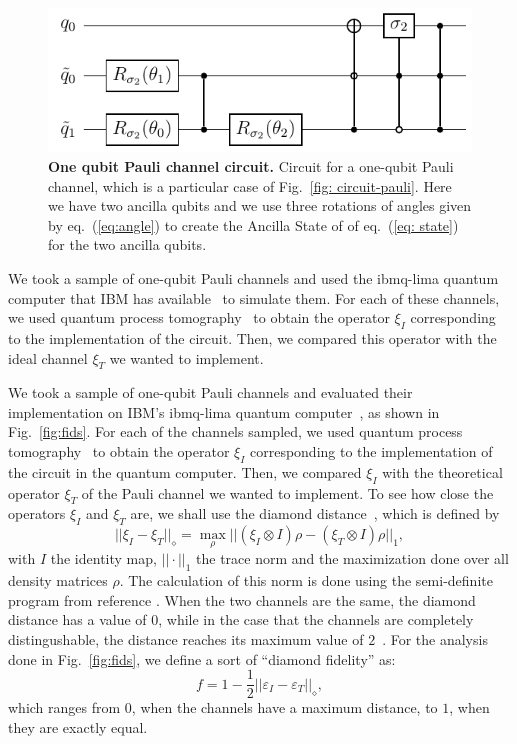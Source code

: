 \documentclass[10pt,letterpaper]{article} %
\newcommand{\fref}[1]{Fig.~\ref{#1}}
\newcommand{\eref}[1]{eq.~(\ref{#1})}
\begin{document}
\begin{figure} %
\centering
\includegraphics{images/circuito_unqubit.pdf}
\caption{
{\bf One qubit Pauli channel circuit.} Circuit for a one-qubit Pauli channel,
which is a particular case of \fref{fig: circuit-pauli}.  Here we have two
ancilla qubits and we use three rotations
of angles given by \eref{eq:angle} to create the Ancilla State of
of \eref{eq: state} for the two ancilla qubits.
}
\label{fig: circuit-pauli-1} 
\end{figure} %


We took a sample of one-qubit Pauli channels and
used the ibmq-lima quantum computer that IBM has available~\cite{Qiskit}
to simulate them. For each of these channels, we used quantum process
tomography~\cite{Qiskit, Chuang:1996} to obtain the 
operator $\xi_I$ corresponding to the implementation of the
circuit.  Then, we compared this operator with the ideal 
channel $\xi_T$  we
wanted to implement.  


We took a sample of one-qubit Pauli channels
and evaluated their implementation on IBM's
ibmq-lima quantum computer~\cite{Qiskit},
as shown in \fref{fig:fids}. 
For each of the channels sampled, we used 
quantum process tomography~\cite{Qiskit, Chuang:1996} to obtain the 
operator $\xi_I$ corresponding to the implementation of the
circuit in the quantum computer. 
Then, we compared $\xi_I$ with the theoretical 
operator $\xi_T$ of the Pauli channel we wanted to implement.
To see how close the operators $\xi_I$ and 
$\xi_T$ are, we shall use the
diamond distance~\cite{Aharonov,Wilde}, which is defined by
\begin{equation}
||\xi_I - \xi_T ||_{\diamond}  = \max_{\rho} || (\xi_I \otimes I) \rho - (\xi_T \otimes I) \rho ||_1,
\end{equation}
with $I$ the identity map,
$|| \cdot ||_1$ the trace norm and the maximization
done over all density matrices $\rho$.
The calculation of this norm is done using the semi-definite program from reference \cite{Watrous}.
When the two channels are the same,
the diamond distance has a value of $0$, while in the case that the channels
are completely distingushable, the distance reaches its maximum value of $2$~\cite{Benenti}.
For the analysis done in \fref{fig:fids}, we define a sort of ``diamond fidelity'' as: 
\begin{equation}
f = 1 - \dfrac{1}{2} ||\varepsilon_I - \varepsilon_T ||_{\diamond},
\label{eq:diamond-fid}
\end{equation}
which ranges from $0$, when the channels have a maximum distance, to  $1$,
when they are exactly equal.
\end{document}
